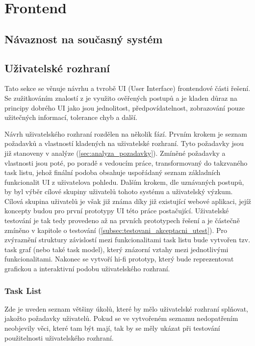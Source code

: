 \documentclass[thesis=M,czech]{FITthesis}[2012/06/26]
\begin{document}
\section{Frontend} \label{sec:navrh_frontend}
\subsection{Návaznost na současný systém}

\subsection{Uživatelské rozhraní}
Tato sekce se věnuje návrhu a tvrobě UI (User Interface) frontendové části řešení. Se zužitkováním znalostí z \cite{nur} je využito ověřených postupů a je kladen důraz na principy dobrého UI jako jsou jednolitost, předpovídatelnost, zobrazování pouze užitečných informací, tolerance chyb a další. 

Návrh uživatelského rozhraní rozdělen na několik fází. Prvním krokem je seznam požadavků a vlastností kladených na uživatelské rozhraní. Tyto požadavky jsou již stanoveny v analýze (\ref{sec:analyza_pozadavky}). Zmíněné požadavky a vlastnosti jsou poté, po poradě s vedoucím práce, transformovaný do takzvaného task listu, jehož finální podoba obsahuje uspořádaný seznam základních funkcionalit UI z uživatelova pohledu. Dalším krokem, dle uznávaných postupů, by byl výběr cílové skupiny uživatelů tohoto systému a uživatelský výzkum. Cílová skupina uživatelů je však již známa díky již existující webové aplikaci, jejíž koncepty budou pro první prototypy UI této práce postačující. Uživatelské testování je tak tedy provedeno až na prvních prototypech řešení a je částečně zmíněno v kapitole o testování (\ref{subsec:testovani_akceptacni_utest}). Pro zvýraznění struktury závislostí mezi funkcionalitami task listu bude vytvořen tzv. task graf (nebo také task model), který znázorní vztahy mezi jednotlivými funkcionalitami. Nakonec se vytvoří hi-fi prototyp, který bude reprezentovat grafickou a interaktivní podobu uživatelského rozhraní.

\subsubsection{Task List} \label{subsubsec:navrh_frontend_ui_tasklist}
Zde je uveden seznam většiny úkolů, které by mělo uživatelské rozhraní splňovat, jakožto požadavky uživatelů. Pokud se ve vytvořeném seznamu nedopatřením neobjevily věci, které tam být mají, tak by se měly ukázat při testování použitelnosti uživatelského rozhraní.
\end{document}

